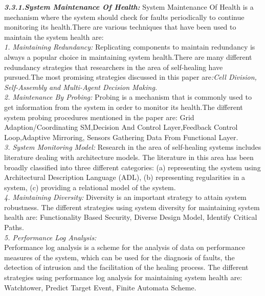 \textbf{\textit{3.3.1.System Maintenance Of Health:}}
System Maintenance Of Health is a mechanism where the system should check for faults periodically to continue monitoring its health.There are various techniques that have been used to maintain the system health are:\\

\textit{1. Maintaining Redundancy:}
Replicating components to maintain redundancy is
always a popular choice in maintaining system health.There are many different redundancy strategies
that researchers in the area of self-healing have pursued.The most promising strategies discussed in this paper are\textit{:Cell Division, Self-Assembly and Multi-Agent Decision Making.}\\

\textit{2. Maintenance By Probing:}
Probing is a mechanism that is commonly used to get
information from the system in order to monitor its health.The different system probing procedures mentioned in the paper are: Grid Adaption/Coordinating SM,Decision And Control Layer,Feedback Control Loop,Adaptive Mirroring, Sensors Gathering Data From Functional Layer.\\

\textit{3. System Monitoring Model:}
Research in the area of self-healing systems includes
literature dealing with architecture models. The literature in this area has been broadly classified into three different categories:
(a) representing the system using Architectural Description Language (ADL), 
(b) representing regularities in a system, 
(c) providing a relational model of the system.\\

\textit{4. Maintaining Diversity:}
Diversity is an important strategy to attain system robustness. The different strategies using system diversity for maintaining system health are: Functionality Based Security, Diverse Design Model, Identify Critical Paths.\\

\textit{5. Performance Log Analysis:}\\
Performance log analysis is a scheme for the analysis of data on performance measures of the system, which can be used for the diagnosis of faults, the detection of intrusion and the facilitation of the healing process. The different strategies using performance log analysis for maintaining system health are: Watchtower, Predict Target Event, Finite Automata Scheme.\\

